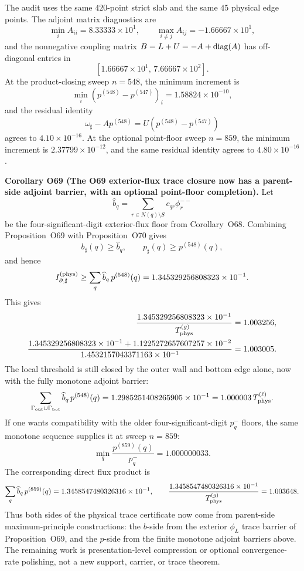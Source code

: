 \documentclass[aps,prd,onecolumn,notitlepage,nofootinbib,superscriptaddress,11pt,floatfix]{revtex4-2}
\begin{document}
The audit
uses the same \(420\)-point strict slab and the same \(45\) physical edge points.  The adjoint matrix diagnostics are
\[
\min_i A_{ii}=8.33333\times10^1,
\qquad
\max_{i\ne j}A_{ij}=-1.66667\times10^1,
\]
and the nonnegative coupling matrix \(B=L+U=-A+{\rm diag}(A)\) has off-diagonal entries in
\[
[1.66667\times10^1,\,7.66667\times10^2].
\]
At the product-closing sweep \(n=548\), the minimum increment is
\[
\min_i(p^{(548)}-p^{(547)})_i=1.58824\times10^{-10},
\]
and the residual identity
\[
\omega_\sharp-Ap^{(548)}
=U(p^{(548)}-p^{(547)})
\]
agrees to \(4.10\times10^{-16}\).  At the optional point-floor sweep \(n=859\), the minimum increment is \(2.37799\times10^{-12}\), and the same residual identity agrees to \(4.80\times10^{-16}\).

\medskip\noindent\textbf{Corollary O69 (The O69 exterior-flux trace closure now has a parent-side adjoint barrier, with an optional point-floor completion).}
Let
\[
\widehat b_q=\sum_{r\in N(q)\setminus S}c_{qr}\phi_r^{--}
\]
be the four-significant-digit exterior-flux floor from Corollary~O68.  Combining Proposition~O69 with Proposition~O70 gives
\[
b_\sharp(q)\ge\widehat b_q,
\qquad
p_\sharp(q)\ge p^{(548)}(q),
\]
and hence
\[
I_{\partial,\sharp}^{(\rm phys)}
\ge
\sum_q \widehat b_q\,p^{(548)}(q)
=1.345329256808323\times10^{-1}.
\]
This gives
\[
\begin{aligned}
\frac{1.345329256808323\times10^{-1}}{T_{\rm phys}^{(g)}}&=1.003256,\\
\frac{
1.345329256808323\times10^{-1}+1.1225272657607257\times10^{-2}
}{
1.4532157043371163\times10^{-1}
}
&=1.003005.
\end{aligned}
\]
The local threshold is still closed by the outer wall and bottom edge alone, now with the fully monotone adjoint barrier:
\[
\sum_{\Gamma_{\rm out}\cup\Gamma_{\rm bot}}
\widehat b_q\,p^{(548)}(q)
=1.2985251408265905\times10^{-1}
=1.000003\,T_{\rm phys}^{(\ell)}.
\]
If one wants compatibility with the older four-significant-digit \(p_q^-\) floors, the same monotone sequence supplies it at sweep \(n=859\):
\[
\min_q\frac{p^{(859)}(q)}{p_q^-}=1.000000033.
\]
The corresponding direct flux product is
\[
\sum_q \widehat b_q\,p^{(859)}(q)
=1.3458547480326316\times10^{-1},
\qquad
\frac{1.3458547480326316\times10^{-1}}{T_{\rm phys}^{(g)}}=1.003648.
\]
Thus both sides of the physical trace certificate now come from parent-side maximum-principle constructions: the \(b\)-side from the exterior \(\phi_L\) trace barrier of Proposition~O69, and the \(p\)-side from the finite monotone adjoint barriers above.  The remaining work is presentation-level compression or optional convergence-rate polishing, not a new support, carrier, or trace theorem.
\end{document}
